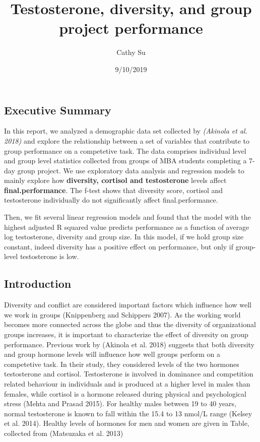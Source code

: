 \documentclass[]{article}
\title{Testosterone, diversity, and group project performance}
\author{Cathy Su}
\date{9/10/2019}
\begin{document}
\maketitle

\hypertarget{executive-summary}{%
\subsection{Executive Summary}\label{executive-summary}}

In this report, we analyzed a demographic data set collected by
\emph{(Akinola et al. 2018)} and explore the relationship between a set
of variables that contribute to group performance on a competetive task.
The data comprises individual level and group level statistics collected
from groups of MBA students completing a 7-day group project. We use
exploratory data analysis and regression models to mainly explore how
\textbf{diversity, cortisol and testosterone} levels affect
\textbf{final.performance}. The f-test shows that diversity score,
cortisol and testosterone individually do not significantly affect
final.performance.

Then, we fit several linear regression models and found that the model
with the highest adjusted R squared value predicts performance as a
function of average log testosterone, diversity and group size. In this
model, if we hold group size constant, indeed diversity has a positive
effect on performance, but only if group-level testosterone is low.

\hypertarget{introduction}{%
\subsection{Introduction}\label{introduction}}

Diversity and conflict are considered important factors which influence
how well we work in groups (Knippenberg and Schippers 2007). As the
working world becomes more connected across the globe and thus the
diversity of organizational groups increases, it is important to
characterize the effect of diversity on group performance. Previous work
by (Akinola et al. 2018) suggests that both diversity and group hormone
levels will influence how well groups perform on a competetive task. In
their study, they considered levels of the two hormones testosterone and
cortisol. Testosterone is involved in dominance and competition related
behaviour in individuals and is produced at a higher level in males than
females, while cortisol is a hormone released during physical and
psychological stress (Mehta and Prasad 2015). For healthy males between
19 to 40 years, normal testosterone is known to fall within the 15.4 to
13 nmol/L range (Kelsey et al. 2014). Healthy levels of hormones for men
and women are given in Table, collected from (Matsuzaka et al. 2013)
\end{document}
